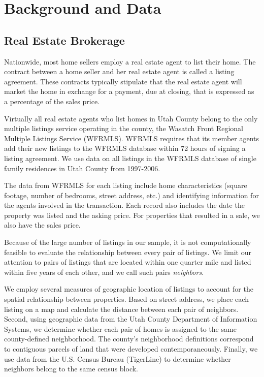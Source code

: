 \documentclass[12pt]{article}
\begin{document}

\section{Background and Data}

\subsection*{Real Estate Brokerage}
    Nationwide, most home sellers employ a real estate agent to list their home. The contract between a home seller and her real estate agent is  called a listing agreement. These contracts typically stipulate that the real estate agent will market the home in exchange for a payment, due at  closing, that is expressed as a percentage of the sales price.

    Virtually all real estate agents who list homes in Utah County belong to the only multiple listings service operating in the county, the Wasatch  Front Regional Multiple Listings Service (WFRMLS).  WFRMLS requires that its member agents add their new listings to the WFRMLS database within 72 hours of signing a listing agreement. We use data on all listings in the WFRMLS database of single family residences in Utah County from 1997-2006.

    The data from WFRMLS for each listing include home characteristics (square footage, number of bedrooms, street address, etc.) and identifying information for the agents involved in the transaction. Each record also includes the date the property was listed and the asking price. For properties that resulted in a sale, we also have the sales price.

    Because of the large number of listings in our sample, it is not computationally feasible to evaluate the relationship
    between every pair of listings. We limit our attention to pairs of listings that are located within one quarter mile and listed within five years of each
    other, and we call such pairs \emph{neighbors}.

    We employ several measures of geographic location of listings to account for the spatial relationship between properties.  Based on
    street address, we place each listing on a map and calculate the distance between each pair of
    neighbors.  Second, using geographic data from the Utah County Department of Information Systems, we determine whether each pair of homes is
    assigned to the same county-defined neighborhood. The county's neighborhood definitions correspond to contiguous parcels of land that were
    developed
    contemporaneously.  Finally, we use data from the U.S. Census Bureau (TigerLine) to determine whether neighbors belong to the same census block.
\end{document}
